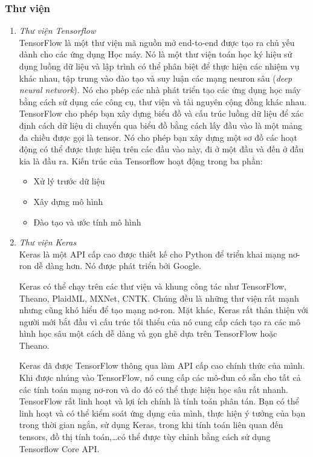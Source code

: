 \subsubsection{Thư viện}
\begin{enumerate}
    \item \textit{Thư viện Tensorflow}\\
    TensorFlow là một thư viện mã nguồn mở end-to-end được tạo ra chủ yếu dành cho các ứng dụng Học máy. Nó là một thư viện toán học ký hiệu sử dụng luồng dữ liệu và lập trình có thể phân biệt để thực hiện các nhiệm vụ khác nhau, tập trung vào đào tạo và suy luận các mạng neuron sâu (\textit{deep neural network}). Nó cho phép các nhà phát triển tạo các ứng dụng học máy bằng cách sử dụng các công cụ, thư viện và tài nguyên cộng đồng khác nhau. \cite{webpage16}\\
    TensorFlow cho phép bạn xây dựng biểu đồ và cấu trúc luồng dữ liệu để xác định cách dữ liệu di chuyển qua biểu đồ bằng cách lấy đầu vào là một mảng đa chiều được gọi là tensor. Nó cho phép bạn xây dựng một sơ đồ các hoạt động có thể được thực hiện trên các đầu vào này, đi ở một đầu và đến ở đầu kia là đầu ra.
    Kiến trúc của Tensorflow hoạt động trong ba phần:
    \begin{itemize}
        \item Xử lý trước dữ liệu
        \item Xây dựng mô hình
        \item Đào tạo và ước tính mô hình
    \end{itemize}
    
    \item \textit{Thư viện Keras}\\
    
    Keras là một API cấp cao được thiết kế cho Python để triển khai mạng nơ-ron dễ dàng hơn. Nó được phát triển bởi Google.

    Keras có thể chạy trên các thư viện và khung công tác như TensorFlow, Theano, PlaidML, MXNet, CNTK. Chúng đều là những thư viện rất mạnh nhưng cũng khó hiểu để tạo mạng nơ-ron. Mặt khác, Keras rất thân thiện với người mới bắt đầu vì cấu trúc tối thiểu của nó cung cấp cách tạo ra các mô hình học sâu một cách dễ dàng và gọn ghẽ dựa trên TensorFlow hoặc Theano.

    Keras đã được TensorFlow thông qua làm API cấp cao chính thức của mình. Khi được nhúng vào TensorFlow, nó cung cấp các mô-đun có sẵn cho tất cả các tính toán mạng nơ-ron và do đó có thể thực hiện học sâu rất nhanh. TensorFlow rất linh hoạt và lợi ích chính là tính toán phân tán. Bạn có thể linh hoạt và có thể kiểm soát ứng dụng của mình, thực hiện ý tưởng của bạn trong thời gian ngắn, sử dụng Keras, trong khi tính toán liên quan đến tensors, đồ thị tính toán,\dots có thể được tùy chỉnh bằng cách sử dụng Tensorflow Core API.


\end{enumerate}
